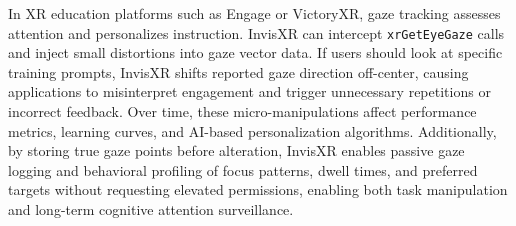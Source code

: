 \documentclass[letterpaper,twocolumn,10pt]{article}
\begin{document}
In XR education platforms such as Engage or VictoryXR, gaze tracking assesses attention and personalizes instruction. InvisXR can intercept \texttt{xrGetEyeGaze} calls and inject small distortions into gaze vector data. If users should look at specific training prompts, InvisXR shifts reported gaze direction off-center, causing applications to misinterpret engagement and trigger unnecessary repetitions or incorrect feedback. Over time, these micro-manipulations affect performance metrics, learning curves, and AI-based personalization algorithms. Additionally, by storing true gaze points before alteration, InvisXR enables passive gaze logging and behavioral profiling of focus patterns, dwell times, and preferred targets without requesting elevated permissions, enabling both task manipulation and long-term cognitive attention surveillance.
\end{document}
